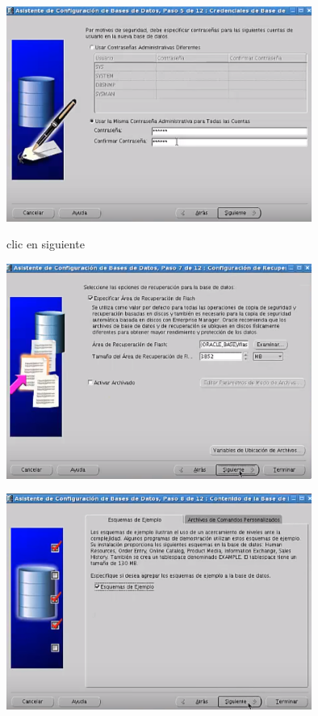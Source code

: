 \documentclass[12pt,letterpaper]{article}
\begin{document}
\begin{center}
\includegraphics[width=10cm]{oraclelinux/40.png}
\end{center}
clic en siguiente \\
\begin{center}
\includegraphics[width=10cm]{oraclelinux/41.png}
\end{center}
\begin{center}
\includegraphics[width=10cm]{oraclelinux/42.png}
\end{center}
\end{document}
